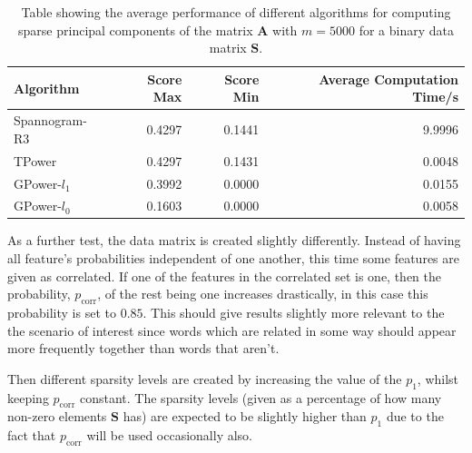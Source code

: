 \documentclass[11pt,a4paper]{article}
\newcommand{\smat}{\mathbf{S}}
\begin{document}
\begin{table}[H]
\center
\begin{tabular}{|l|r|r|r|}
\hline
Algorithm &  Score Max &  Score Min & Average Computation Time/s\\
\hline
  Spannogram-R3&   0.4297&    0.1441&    		9.9996\\
 TPower&   0.4297   & 0.1431   & 		0.0048\\
GPower-$l_1$   & 0.3992  &  0.0000  &  		0.0155\\
   GPower-$l_0$ &  0.1603  &  0.0000 & 		 0.0058\\
\hline

\end{tabular}
\caption{Table showing the average performance of different algorithms for computing sparse principal components of the matrix $\mathbf{A}$ with $m=5000$ for a binary data matrix $\smat$.}
\label{performance_bin_data_5000}
\end{table}

As a further test, the data matrix is created slightly differently. Instead of having all feature's probabilities independent of one another, this time some features are given as correlated. If one of the features in the correlated set is one, then the probability, $p_\text{corr}$, of the rest being one increases drastically, in this case this probability is set to $0.85$. This should give results slightly more relevant to the the scenario of interest since words which are related in some way should appear more frequently together than words that aren't. 

Then different sparsity levels are created by increasing the value of the  $p_\text{1}$, whilst keeping $p_\text{corr}$ constant. The sparsity levels (given as a percentage of how many non-zero elements $\smat$ has) are expected to be slightly higher than $p_\text{1}$ due to the fact that $p_\text{corr}$ will be used occasionally also. 
\end{document}

